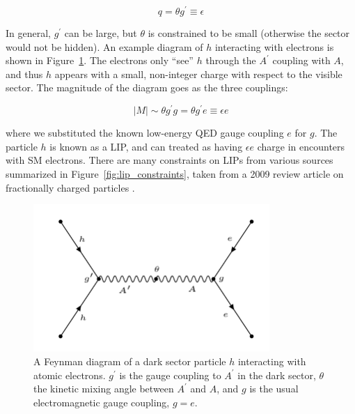 \begin{equation}
q = \theta g^{\prime} \equiv \epsilon
\end{equation}

In general, $g^{\prime}$ can be large, but $\theta$ is constrained to be small (otherwise the sector would not be hidden). An example diagram of $h$ interacting with electrons is shown in Figure~\ref{fig:diagram}. The electrons only ``see'' $h$ through the $A^{\prime}$ coupling with $A$, and thus $h$ appears with a small, non-integer charge with respect to the visible sector. The magnitude of the diagram goes as the three couplings:

\begin{equation}
|M| \sim  \theta g^{\prime} g = \theta g^{\prime} e \equiv \epsilon e
\end{equation}

where we substituted the known low-energy \ac{QED} gauge coupling $e$ for $g$. The particle $h$ is known as a \ac{LIP}, and can treated as having $\epsilon e$ charge in encounters with \ac{SM} electrons.
There are many constraints on \ac{LIP}s from various sources summarized in Figure~\ref{fig:lip_constraints}, taken from a 2009 review article on fractionally charged particles \cite{Perl2009}.

\begin{figure}[htbp]
\begin{center}
\includegraphics[width=0.8\textwidth]{figures/theory/diagram.png}
\caption{ A Feynman diagram of a dark sector particle $h$ interacting with atomic electrons. $g^{\prime}$ is the gauge coupling to $A^{\prime}$ in the dark sector, $\theta$ the kinetic mixing angle between $A^{\prime}$ and $A$, and $g$ is the usual electromagnetic gauge coupling, $g=e$.  }
\label{fig:diagram}
\end{center}
\end{figure}


